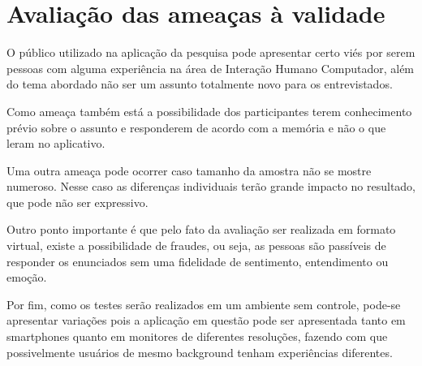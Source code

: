 \documentclass[12pt]{article}
\begin{document}
\section{Avaliação das ameaças à validade}

O público utilizado na aplicação da pesquisa pode apresentar certo viés por serem pessoas com alguma experiência na área de Interação Humano Computador, além do tema abordado não ser um assunto totalmente novo para os entrevistados.

Como ameaça também está a possibilidade dos participantes terem conhecimento prévio sobre o assunto e responderem de acordo com a memória e não o que leram no aplicativo.

Uma outra ameaça pode ocorrer caso tamanho da amostra não se mostre numeroso. Nesse caso as diferenças individuais terão grande impacto no resultado, que pode não ser expressivo.

Outro ponto importante é que pelo fato da avaliação ser realizada em formato virtual, existe a possibilidade de fraudes, ou seja, as pessoas são passíveis de responder os enunciados sem uma fidelidade de sentimento, entendimento ou emoção.

Por fim, como os testes serão realizados em um ambiente sem controle, pode-se apresentar variações pois a aplicação em questão pode ser apresentada tanto em smartphones quanto em monitores de diferentes resoluções, fazendo com que possivelmente usuários de mesmo background tenham experiências diferentes.



\end{document}
